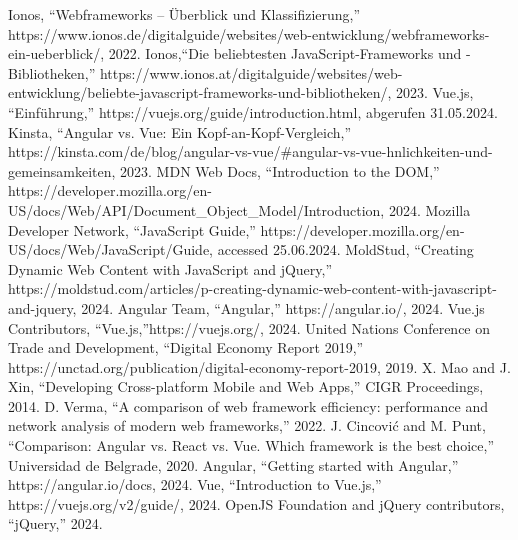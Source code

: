 \documentclass[conference]{IEEEtran}
\begin{document}
\begin{thebibliography}{00}
 Ionos, ``Webframeworks – Überblick und Klassifizierung,'' https://www.ionos.de/digitalguide/websites/web-entwicklung/webframeworks-ein-ueberblick/, 2022.
 Ionos,``Die beliebtesten JavaScript-Frameworks und -Bibliotheken,'' https://www.ionos.at/digitalguide/websites/web-entwicklung/beliebte-javascript-frameworks-und-bibliotheken/, 2023.
 Vue.js, ``Einführung,'' https://vuejs.org/guide/introduction.html, abgerufen 31.05.2024.
 Kinsta, ``Angular vs. Vue: Ein Kopf-an-Kopf-Vergleich,'' https://kinsta.com/de/blog/angular-vs-vue/#angular-vs-vue-hnlichkeiten-und-gemeinsamkeiten, 2023.
 MDN Web Docs, ``Introduction to the DOM,'' https://developer.mozilla.org/en-US/docs/Web/API/Document_Object_Model/Introduction, 2024.
 Mozilla Developer Network, ``JavaScript Guide,'' https://developer.mozilla.org/en-US/docs/Web/JavaScript/Guide, accessed 25.06.2024.
 MoldStud, ``Creating Dynamic Web Content with JavaScript and jQuery,'' https://moldstud.com/articles/p-creating-dynamic-web-content-with-javascript-and-jquery, 2024.
 Angular Team, ``Angular,'' https://angular.io/, 2024.
 Vue.js Contributors, ``Vue.js,''https://vuejs.org/, 2024.
 United Nations Conference on Trade and Development, ``Digital Economy Report 2019,'' https://unctad.org/publication/digital-economy-report-2019, 2019.
 X. Mao and J. Xin, ``Developing Cross-platform Mobile and Web Apps,'' CIGR Proceedings, 2014.
 D. Verma, ``A comparison of web framework efficiency: performance and network analysis of modern web frameworks,'' 2022.
 J. Cincović and M. Punt, ``Comparison: Angular vs. React vs. Vue. Which framework is the best choice,'' Universidad de Belgrade, 2020.
 Angular, ``Getting started with Angular,'' https://angular.io/docs, 2024.
 Vue, ``Introduction to Vue.js,'' https://vuejs.org/v2/guide/, 2024.
 OpenJS Foundation and jQuery contributors, ``jQuery,'' 2024.
\end{thebibliography}
\vspace{12pt}
\color{red}


\end{document}
